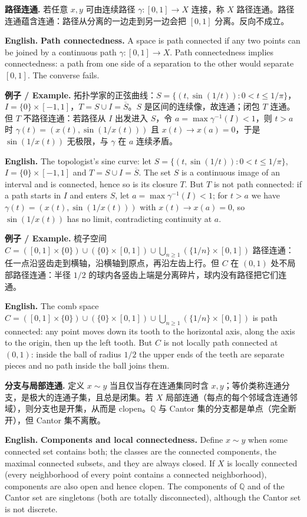 \documentclass[UTF8,11pt,a4paper]{ctexart}
\newcommand{\EN}[1]{\par\noindent\textbf{English.} #1\par}
\newcommand{\EX}[2]{\par\noindent\textbf{例子 / Example.} #1\par\EN{#2}}
\begin{document}
\noindent\textbf{路径连通.} 若任意 $x,y$ 可由连续路径 $\gamma:[0,1]\to X$ 连接，称 $X$ 路径连通。路径连通蕴含连通：路径从分离的一边走到另一边会把 $[0,1]$ 分离。反向不成立。
\EN{\textbf{Path connectedness.} A space is path connected if any two points can be joined by a continuous path $\gamma:[0,1]\to X$. Path connectedness implies connectedness: a path from one side of a separation to the other would separate $[0,1]$. The converse fails.}

\EX{拓扑学家的正弦曲线：$S=\{(t,\sin(1/t)):0<t\le1/\pi\}$，$I=\{0\}\times[-1,1]$，$T=S\cup I=\overline S$。$S$ 是区间的连续像，故连通；闭包 $T$ 连通。但 $T$ 不路径连通：若路径从 $I$ 出发进入 $S$，令 $a=\max\gamma^{-1}(I)<1$，则 $t>a$ 时 $\gamma(t)=(x(t),\sin(1/x(t)))$ 且 $x(t)\to x(a)=0$，于是 $\sin(1/x(t))$ 无极限，与 $\gamma$ 在 $a$ 连续矛盾。}{The topologist's sine curve: let $S=\{(t,\sin(1/t)):0<t\le1/\pi\}$, $I=\{0\}\times[-1,1]$ and $T=S\cup I=\overline S$. The set $S$ is a continuous image of an interval and is connected, hence so is its closure $T$. But $T$ is not path connected: if a path starts in $I$ and enters $S$, let $a=\max\gamma^{-1}(I)<1$; for $t>a$ we have $\gamma(t)=(x(t),\sin(1/x(t)))$ with $x(t)\to x(a)=0$, so $\sin(1/x(t))$ has no limit, contradicting continuity at $a$.}

\EX{梳子空间 $C=([0,1]\times\{0\})\cup(\{0\}\times[0,1])\cup\bigcup_{n\ge1}(\{1/n\}\times[0,1])$ 路径连通：任一点沿竖齿走到横轴，沿横轴到原点，再沿左齿上行。但 $C$ 在 $(0,1)$ 处不局部路径连通：半径 $1/2$ 的球内各竖齿上端是分离碎片，球内没有路径把它们连通。}{The comb space $C=([0,1]\times\{0\})\cup(\{0\}\times[0,1])\cup\bigcup_{n\ge1}(\{1/n\}\times[0,1])$ is path connected: any point moves down its tooth to the horizontal axis, along the axis to the origin, then up the left tooth. But $C$ is not locally path connected at $(0,1)$: inside the ball of radius $1/2$ the upper ends of the teeth are separate pieces and no path inside the ball joins them.}

\noindent\textbf{分支与局部连通.} 定义 $x\sim y$ 当且仅当存在连通集同时含 $x,y$；等价类称连通分支，是极大的连通子集，且总是闭集。若 $X$ 局部连通（每点的每个邻域含连通邻域），则分支也是开集，从而是 clopen。$\mathbb Q$ 与 Cantor 集的分支都是单点（完全断开），但 Cantor 集不离散。
\EN{\textbf{Components and local connectedness.} Define $x\sim y$ when some connected set contains both; the classes are the connected components, the maximal connected subsets, and they are always closed. If $X$ is locally connected (every neighborhood of every point contains a connected neighborhood), components are also open and hence clopen. The components of $\mathbb Q$ and of the Cantor set are singletons (both are totally disconnected), although the Cantor set is not discrete.}
\end{document}
